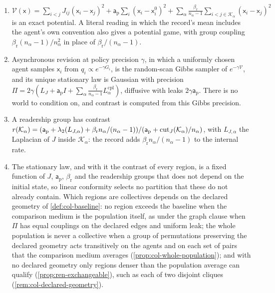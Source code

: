 \begin{proposition}\label{prop:hie-conformity}
\begin{enumerate}
\item[(a)] $\mathcal V(\mathsf x)=\sum_{i<j}J_{ij}(\mathsf x_i-\mathsf x_j)^2+\mathsf a_{\mathrm p}\sum_i(\mathsf x_i-\mathsf x^0_i)^2+\sum_\alpha\frac{\beta_{\mathrm r}}{n_\alpha-1}\sum_{i<j\in\mathcal K_\alpha}(\mathsf x_i-\mathsf x_j)^2$ is an exact potential. A literal reading in which the record's mean includes the agent's own convention also gives a potential game, with group coupling $\beta_{\mathrm r}(n_\alpha-1)/n_\alpha^2$ in place of $\beta_{\mathrm r}/(n_\alpha-1)$.
\item[(b)] Asynchronous revision at policy precision $\gamma$, in which a uniformly chosen agent samples $\mathsf x_i$ from $q_i\propto e^{-\gamma G_i}$, is the random-scan Gibbs sampler of $e^{-\gamma\mathcal V}$, and its unique stationary law is Gaussian with precision $\Pi=2\gamma(L_J+\mathsf a_{\mathrm p}I+\sum_\alpha\frac{\beta_{\mathrm r}}{n_\alpha-1}L^{\mathrm{cpl}}_\alpha)$, diffusive with leaks $2\gamma\mathsf a_{\mathrm p}$. There is no world to condition on, and contrast is computed from this Gibbs precision.
\item[(c)] A readership group has contrast $r(\mathcal K_\alpha)=(\mathsf a_{\mathrm p}+\lambda_2(L_{J,\alpha})+\beta_{\mathrm r}n_\alpha/(n_\alpha-1))/(\mathsf a_{\mathrm p}+\operatorname{cut}_J(\mathcal K_\alpha)/n_\alpha)$, with $L_{J,\alpha}$ the Laplacian of $J$ inside $\mathcal K_\alpha$: the record adds $\beta_{\mathrm r}n_\alpha/(n_\alpha-1)$ to the internal rate.
\item[(d)] The stationary law, and with it the contrast of every region, is a fixed function of $J$, $\mathsf a_{\mathrm p}$, $\beta_{\mathrm r}$ and the readership groups that does not depend on the initial state, so linear conformity selects no partition that these do not already contain. Which regions are collectives depends on the declared geometry of \cref{def:col-baseline}: no region exceeds the baseline when the comparison medium is the population itself, as under the graph clause when $\Pi$ has equal couplings on the declared edges and uniform leak; the whole population is never a collective when a group of permutations preserving the declared geometry acts transitively on the agents and on each set of pairs that the comparison medium averages (\cref{prop:col-whole-population}); and with no declared geometry only regions denser than the population average can qualify (\cref{prop:ren-exchangeable}), such as each of two disjoint cliques (\cref{rem:col-declared-geometry}).

\end{enumerate}
\end{proposition}
